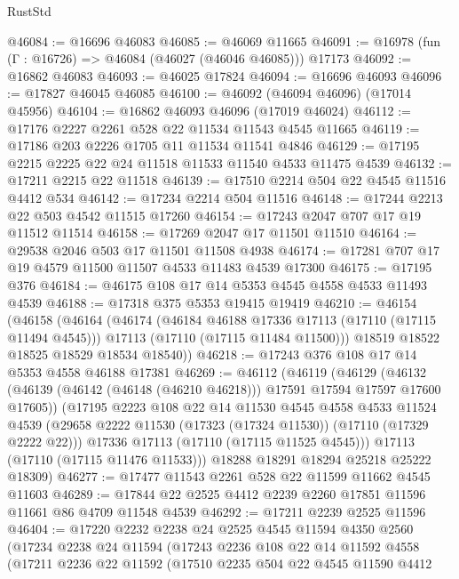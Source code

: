 \begin{lexlean}{RustStd}
\begin{coremodule}
@46084 := @16696 @46083
@46085 := @46069 @11665
@46091 := @16978 (fun (Γ : @16726) => @46084 (@46027 (@46046 @46085))) @17173
@46092 := @16862 @46083
@46093 := @46025 @17824
@46094 := @16696 @46093
@46096 := @17827 @46045 @46085
@46100 := @46092 (@46094 @46096) (@17014 @45956)
@46104 := @16862 @46093 @46096 (@17019 @46024)
@46112 := @17176 @2227 @2261 @528 @22 @11534 @11543 @4545 @11665
@46119 := @17186 @203 @2226 @1705 @11 @11534 @11541 @4846
@46129 := @17195 @2215 @2225 @22 @24 @11518 @11533 @11540 @4533 @11475 @4539
@46132 := @17211 @2215 @22 @11518
@46139 := @17510 @2214 @504 @22 @4545 @11516 @4412 @534
@46142 := @17234 @2214 @504 @11516
@46148 := @17244 @2213 @22 @503 @4542 @11515 @17260
@46154 := @17243 @2047 @707 @17 @19 @11512 @11514
@46158 := @17269 @2047 @17 @11501 @11510
@46164 := @29538 @2046 @503 @17 @11501 @11508 @4938
@46174 := @17281 @707 @17 @19 @4579 @11500 @11507 @4533 @11483 @4539 @17300
@46175 := @17195 @376
@46184 := @46175 @108 @17 @14 @5353 @4545 @4558 @4533 @11493 @4539
@46188 := @17318 @375 @5353 @19415 @19419
@46210 := @46154
    (@46158
      (@46164
        (@46174
          (@46184 @46188 @17336 @17113 (@17110 (@17115 @11494 @4545)))
          @17113
          (@17110 (@17115 @11484 @11500)))
        @18519
        @18522
        @18525
        @18529
        @18534
        @18540))
@46218 := @17243 @376 @108 @17 @14 @5353 @4558 @46188 @17381
@46269 := @46112
    (@46119
      (@46129
        (@46132 (@46139 (@46142 (@46148 (@46210 @46218))) @17591 @17594 @17597 @17600 @17605))
        (@17195
          @2223
          @108
          @22
          @14
          @11530
          @4545
          @4558
          @4533
          @11524
          @4539
          (@29658 @2222 @11530 (@17323 (@17324 @11530)) (@17110 (@17329 @2222 @22)))
          @17336
          @17113
          (@17110 (@17115 @11525 @4545)))
        @17113
        (@17110 (@17115 @11476 @11533)))
      @18288
      @18291
      @18294
      @25218
      @25222
      @18309)
@46277 := @17477 @11543 @2261 @528 @22 @11599 @11662 @4545 @11603
@46289 := @17844 @22 @2525 @4412 @2239 @2260 @17851 @11596 @11661 @86 @4709 @11548 @4539
@46292 := @17211 @2239 @2525 @11596
@46404 := @17220
    @2232
    @2238
    @24
    @2525
    @4545
    @11594
    @4350
    @2560
    (@17234
      @2238
      @24
      @11594
      (@17243
        @2236
        @108
        @22
        @14
        @11592
        @4558
        (@17211
          @2236
          @22
          @11592
          (@17510
            @2235
            @504
            @22
            @4545
            @11590
            @4412

\end{coremodule}
\end{lexlean}
